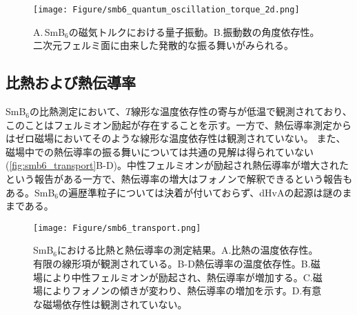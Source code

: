 \begin{figure*}[!thb]
	\begin{center}
		\texttt{[image: Figure/smb6\_quantum\_oscillation\_torque\_2d.png]}
\caption{\small{A.\,SmB$_6$の磁気トルクにおける量子振動\cite{SmB6_byLi}。B.振動数の角度依存性。二次元フェルミ面に由来した発散的な振る舞いがみられる。}}
\label{fig:smb6_quantum_oscillation_2d}
    \end{center}
\end{figure*}

\begin{comment}
----- MAYBE -------------
電気抵抗の磁場依存性のやつは、SdHがないことの説明なんじゃないの？？？其れ入れるか？？
\end{comment}


\subsection{比熱および熱伝導率}
SmB$_6$の比熱測定において、$T$線形な温度依存性の寄与が低温で観測されており、このことはフェルミオン励起が存在することを示す。一方で、熱伝導率測定からはゼロ磁場においてそのような線形な温度依存性は観測されていない。
また、磁場中での熱伝導率の振る舞いについては共通の見解は得られていない(\autoref{fig:smb6_transport}B-D)。中性フェルミオンが励起され熱伝導率が増大されたという報告がある一方で\cite{smb6_transport}、熱伝導率の増大はフォノンで解釈できるという報告もある\cite{PhysRevB_97_245141}。SmB$_6$の遍歴準粒子については決着が付いておらず、dHvAの起源は謎のままである。\par

\begin{comment}
---------- 疑問QQQ --------------\\
比熱の磁場依存性はどうなってるん？LaB6は何て比較するため？\\
\end{comment}

\begin{figure*}[!thb]
	\begin{center}
		\texttt{[image: Figure/smb6\_transport.png]}
\caption{SmB$_6$における比熱と熱伝導率の測定結果。A.比熱の温度依存性。有限の線形項が観測されている。B-D熱伝導率の温度依存性。B.磁場により中性フェルミオンが励起され、熱伝導率が増加する\cite{smb6_transport}。C.磁場によりフォノンの傾きが変わり、熱伝導率の増加を示す\cite{PhysRevB_97_245141}。D.有意な磁場依存性は観測されていない\cite{PhysRevLett}。}
\label{fig:smb6_transport}
    \end{center}
\end{figure*}


